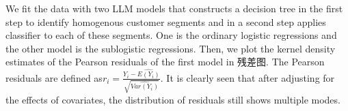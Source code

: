 \documentclass[11pt,onside,a4paper,fleqn]{report}
\begin{document}
\hspace{0.8cm}We fit the data with two LLM models that constructs a decision tree in the first step to identify homogenous customer segments 
and in a second step applies classifier to each of these segments. One is the ordinary logistic regressions and the other model is the sublogistic regressions. 
Then, we plot the kernel density estimates of the Pearson residuals of the first model in 残差图. The Pearson residuals are defined as$r_{i} = \frac{Y_{i}-\widehat{E(Y_{i})}}{\sqrt{\widehat{Var(Y_{i})}}}$.
It is clearly seen that after adjusting for the effects of covariates, the distribution of residuals still shows multiple modes.
\begin{figure}[htbp]
      \centering
      \quad
\end{figure}
\end{document}
